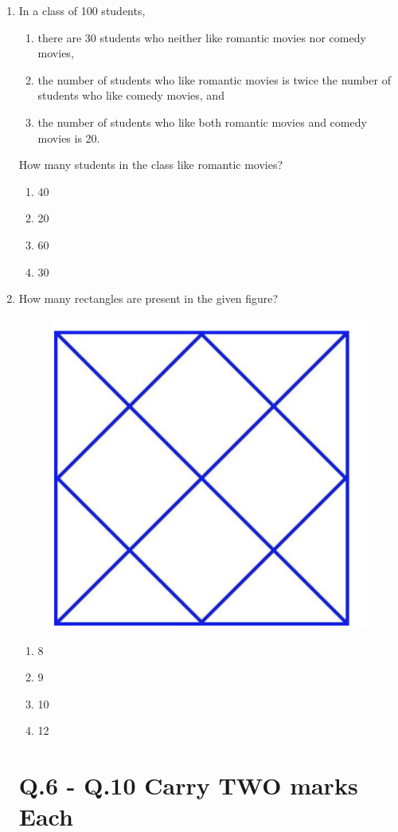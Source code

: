 \documentclass[journal]{IEEEtran}
\begin{document}
\begin{enumerate}
\item 
In a class of 100 students,
\begin{enumerate}
    \item there are 30 students who neither like romantic movies nor comedy movies,
    \item the number of students who like romantic movies is twice the number of students who like comedy movies, and
    \item the number of students who like both romantic movies and comedy movies is 20.
\end{enumerate}

How many students in the class like romantic movies?
\hfill{}

\begin{enumerate}
    \item 40
    \item 20
    \item 60
    \item 30
\end{enumerate}
\hfill{}

\newpage
\item  
How many rectangles are present in the given figure?
\begin{figure}[H]
    \centering
    \includegraphics[width=0.4\columnwidth]{Figs/Q5}
    \caption{}
    \label{}
\end{figure}

\begin{enumerate}
    \item 8
    \item 9
    \item 10
    \item 12
\end{enumerate}
\hfill{}

\section*{Q.6 - Q.10 Carry TWO marks Each}


\end{enumerate}
\end{document}
